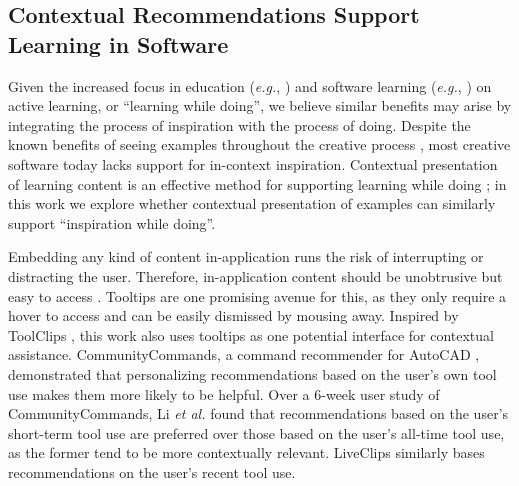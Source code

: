 \subsection{Contextual Recommendations Support Learning in Software}
Given the increased focus in education (\textit{e.g.}, \cite{Prince2004}) and software learning (\textit{e.g.}, \cite{Greene2002, Grossman2010a}) on active learning, or ``learning while doing'', we believe similar benefits may arise by integrating the process of inspiration with the process of doing. Despite the known benefits of seeing examples throughout the creative process \cite{Kulkarni2014}, most creative software today lacks support for in-context inspiration. Contextual presentation of learning content is an effective method for supporting learning while doing \cite{Grossman2010a, Matejka2011, Ichinco2017, Matejka2009}; in this work we explore whether contextual presentation of examples can similarly support ``inspiration while doing''. 

Embedding any kind of content in-application runs the risk of interrupting or distracting the user. Therefore, in-application content should be unobtrusive but easy to access \cite{Grossman2010a}. Tooltips are one promising avenue for this, as they only require a hover to access and can be easily dismissed by mousing away. Inspired by ToolClips \cite{Grossman2010a}, this work also uses tooltips as one potential interface for contextual assistance. 
CommunityCommands, a command recommender for AutoCAD \cite{Matejka2009}, demonstrated that personalizing recommendations based on the user's own tool use makes them more likely to be helpful. Over a 6-week user study of CommunityCommands, Li \textit{et al.} \cite{Li2011} found that recommendations based on the user's short-term tool use are preferred over those based on the user's all-time tool use, as the former tend to be more contextually relevant. LiveClips similarly bases recommendations on the user's recent tool use.


